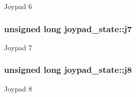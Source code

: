 Joypad 6 \hypertarget{structjoypad__state_ead82eecb6a91d577364993ce6d479d4}{
\subsubsection{\setlength{\rightskip}{0pt plus 5cm}unsigned long {\bf joypad\_\-state::j7}}}
\label{structjoypad__state_ead82eecb6a91d577364993ce6d479d4}


Joypad 7 \hypertarget{structjoypad__state_4d163e85f6d8fdeab81ea992cc9c058f}{
\subsubsection{\setlength{\rightskip}{0pt plus 5cm}unsigned long {\bf joypad\_\-state::j8}}}
\label{structjoypad__state_4d163e85f6d8fdeab81ea992cc9c058f}


Joypad 8 